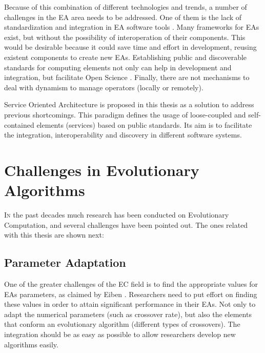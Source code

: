 Because of this combination of different technologies and trends, %
a number of challenges in the EA area needs to be addressed.  One of
them is the lack of standardization and integration in EA software
tools \cite{SURVEYMOFS}. Many frameworks for EAs exist, but without
the possibility of interoperation of their components. 
This would be desirable because it could save time and effort in 
development, reusing existent components to create new EAs. %
Establishing public and discoverable standards for computing elements
not only can help in development and integration, but facilitate Open
Science \cite{Foster2005Science}. Finally, there are not mechanisms to
deal with dynamism to manage operators (locally or remotely). %

Service Oriented Architecture \cite{Papazoglou2007SOA} is proposed in
this thesis as a solution to address previous shortcomings. This
paradigm defines the usage of loose-coupled and self-contained
elements (services) based on public standards. Its aim is to facilitate
the integration, interoperability and discovery in different software
systems. 


\section{Challenges in Evolutionary Algorithms}
\label{sec:intro:challenges}

\lettrine{I}{n} the past decades much research has been conducted on Evolutionary Computation, and several challenges have been pointed out. The ones related with this thesis are shown next:

\subsection{Parameter Adaptation}

One of the greater challenges of the EC field is to find the appropriate values for EAs parameters, as claimed by {\person Eiben \etal} 
\cite{Eiben12Parameters}. Researchers need to put effort on finding these values in order to
attain significant performance in their EAs. Not only to adapt the numerical parameters (such as crossover rate), but also the elements that conform an evolutionary algorithm (different types of crossovers). The integration should be as easy as possible to allow researchers develop new algorithms easily. 

